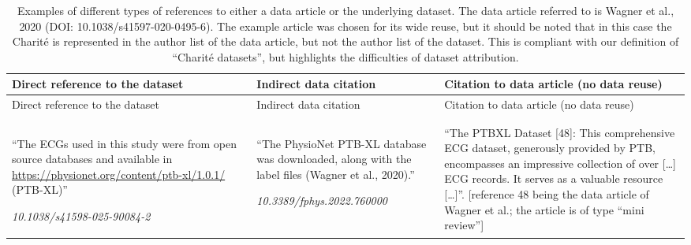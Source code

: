 \documentclass[
  letterpaper,
  DIV=11,
  numbers=noendperiod]{scrartcl}
\begin{document}
\begin{longtable}[]{@{}
  >{\raggedright\arraybackslash}p{}
  >{\raggedright\arraybackslash}p{}
  >{\raggedright\arraybackslash}p{}@{}}
\toprule\noalign{}
\begin{minipage}[b]{\linewidth}\raggedright
Direct reference to the dataset
\end{minipage} & \begin{minipage}[b]{\linewidth}\raggedright
Indirect data citation
\end{minipage} & \begin{minipage}[b]{\linewidth}\raggedright
Citation to data article (no data reuse)
\end{minipage} \\
\midrule\noalign{}
\endfirsthead
\toprule\noalign{}
\begin{minipage}[b]{\linewidth}\raggedright
Direct reference to the dataset
\end{minipage} & \begin{minipage}[b]{\linewidth}\raggedright
Indirect data citation
\end{minipage} & \begin{minipage}[b]{\linewidth}\raggedright
Citation to data article (no data reuse)
\end{minipage} \\
\midrule\noalign{}
\endhead
\bottomrule\noalign{}
\tabularnewline
\caption{Examples of different types of references to either a data
article or the underlying dataset. The data article referred to is
Wagner et al., 2020 (DOI: 10.1038/s41597-020-0495-6). The example
article was chosen for its wide reuse, but it should be noted that in
this case the Charité is represented in the author list of the data
article, but not the author list of the dataset. This is compliant with
our definition of ``Charité datasets'', but highlights the difficulties
of dataset attribution.}\label{tbl-data-articles}\tabularnewline
\endlastfoot
``The ECGs used in this study were from open source databases and
available in \url{https://physionet.org/content/ptb-xl/1.0.1/}
(PTB-XL)''

\emph{10.1038/s41598-025-90084-2} & ``The PhysioNet PTB-XL database was
downloaded, along with the label files (Wagner et al., 2020).''

\emph{10.3389/fphys.2022.760000} & ``The PTBXL Dataset {[}48{]}: This
comprehensive ECG dataset, generously provided by PTB, encompasses an
impressive collection of over {[}\ldots{]} ECG records. It serves as a
valuable resource {[}\ldots{]}''. {[}reference 48 being the data article
of Wagner et al.; the article is of type ``mini review''{]}


\end{longtable}
\end{document}
